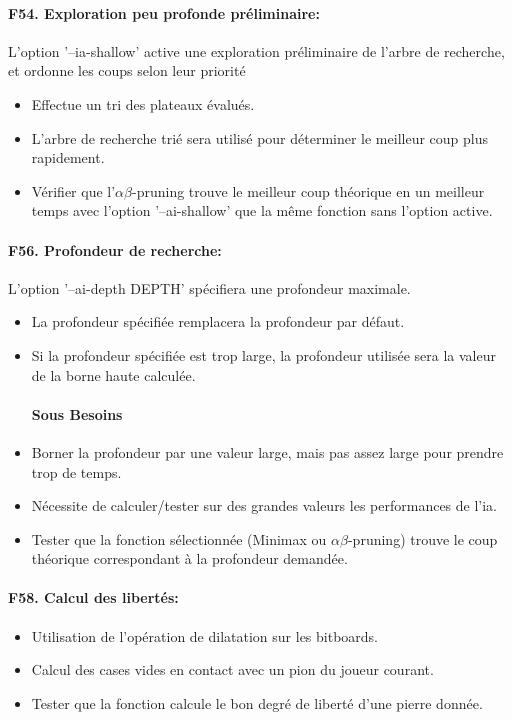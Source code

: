 \documentclass[a4paper,12pt]{article}
\begin{document}
\paragraph{F54. Exploration peu profonde préliminaire:} L'option '--ia-shallow' active une exploration préliminaire de l'arbre de
recherche, et ordonne les coups selon leur priorité
\begin{itemize}
  \item Effectue un tri des plateaux évalués.
  \item L'arbre de recherche trié sera utilisé pour déterminer le meilleur coup plus
        rapidement.
  \item Vérifier que l'$\alpha\beta$-pruning trouve le meilleur coup théorique en un
        meilleur temps avec l'option '--ai-shallow' que la même fonction sans l'option
        active.
\end{itemize}

\paragraph{F56. Profondeur de recherche:} L'option '--ai-depth DEPTH' spécifiera une profondeur maximale.
\begin{itemize}
  \item La profondeur spécifiée remplacera la profondeur par défaut.
  \item Si la profondeur spécifiée est trop large, la profondeur utilisée sera la
        valeur de la borne haute calculée.
        \paragraph{Sous Besoins}
  \item Borner la profondeur par une valeur large, mais pas assez large pour prendre
        trop de temps.
  \item Nécessite de calculer/tester sur des grandes valeurs les performances de l'ia.
  \item Tester que la fonction sélectionnée (Minimax ou $\alpha\beta$-pruning) trouve
        le coup théorique correspondant à la profondeur demandée.
\end{itemize}

\paragraph{F58. Calcul des libertés:}
\begin{itemize}
  \item Utilisation de l'opération de dilatation sur les bitboards.
  \item Calcul des cases vides en contact avec un pion du joueur courant.
  \item Tester que la fonction calcule le bon degré de liberté d'une pierre donnée.
\end{itemize}
\end{document}
